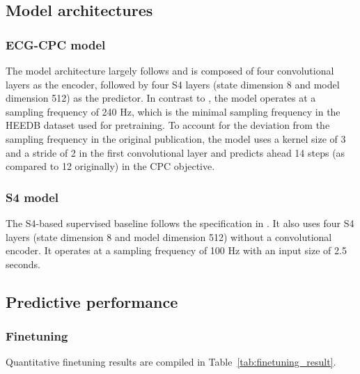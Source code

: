 \documentclass{article}
\begin{document}
        \subsection{Model architectures}

            \subsubsection{ECG-CPC model}
            The model architecture largely follows \citep{mehari2023towards} and is composed of four convolutional layers as the encoder, followed by four S4 layers \citep{gu2022efficiently} (state dimension 8 and model dimension 512) as the predictor. In contrast to \citep{mehari2023towards}, the model operates at a sampling frequency of 240 Hz, which is the minimal sampling frequency in the HEEDB dataset \citep{koscova2024harvard} used for pretraining. To account for the deviation from the sampling frequency in the original publication, the model uses a kernel size of 3 and a stride of 2 in the first convolutional layer and predicts ahead 14 steps (as compared to 12 originally) in the CPC objective.
            
            \subsubsection{S4 model}
            The S4-based supervised baseline follows the specification in \citep{Strodthoff2024}. It also uses four S4 layers \citep{gu2022efficiently} (state dimension 8 and model dimension 512) without a convolutional encoder. It operates at a sampling frequency of 100 Hz with an input size of 2.5 seconds.


        \subsection{Predictive performance}

            \subsubsection{Finetuning}
            Quantitative finetuning results are compiled in Table~\ref{tab:finetuning_result}.
\end{document}
